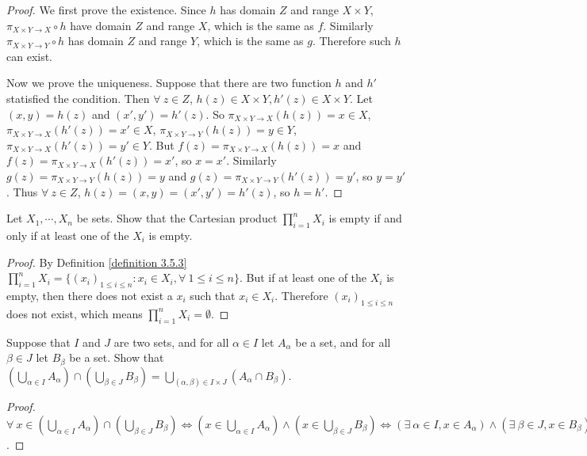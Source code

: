 \begin{proof}
We first prove the existence.
Since \(h\) has domain \(Z\) and range \(X \times Y\), \(\pi_{X \times Y \to X} \circ h\) have domain \(Z\) and range \(X\), which is the same as \(f\).
Similarly \(\pi_{X \times Y \to Y} \circ h\) has domain \(Z\) and range \(Y\), which is the same as \(g\).
Therefore such \(h\) can exist.

Now we prove the uniqueness.
Suppose that there are two function \(h\) and \(h'\) statisfied the condition.
Then \(\forall\ z \in Z\), \(h(z) \in X \times Y, h'(z) \in X \times Y\).
Let \((x, y) = h(z)\) and \((x', y') = h'(z)\).
So \(\pi_{X \times Y \to X}(h(z)) = x \in X\), \(\pi_{X \times Y \to X}(h'(z)) = x' \in X\), \(\pi_{X \times Y \to Y}(h(z)) = y \in Y\), \(\pi_{X \times Y \to X}(h'(z)) = y' \in Y\).
But \(f(z) = \pi_{X \times Y \to X}(h(z)) = x\) and \(f(z) = \pi_{X \times Y \to X}(h'(z)) = x'\), so \(x = x'\).
Similarly \(g(z) = \pi_{X \times Y \to Y}(h(z)) = y\) and \(g(z) = \pi_{X \times Y \to Y}(h'(z)) = y'\), so \(y = y'\).
Thus \(\forall\ z \in Z\), \(h(z) = (x, y) = (x', y') = h'(z)\), so \(h = h'\).
\end{proof}

\begin{exercise}\label{exercise 3.5.8}
Let \(X_1, \cdots, X_n\) be sets.
Show that the Cartesian product \(\prod_{i = 1}^n X_i\) is empty if and only if at least one of the \(X_i\) is empty.
\end{exercise}

\begin{proof}
By Definition \ref{definition 3.5.3} \(\prod_{i = 1}^n X_i = \{(x_i)_{1 \leq i \leq n} : x_i \in X_i, \forall\ 1 \leq i \leq n\}\).
But if at least one of the \(X_i\) is empty, then there does not exist a \(x_i\) such that \(x_i \in X_i\).
Therefore \((x_i)_{1 \leq i \leq n}\) does not exist, which means \(\prod_{i = 1}^n X_i = \emptyset\).
\end{proof}

\begin{exercise}\label{exercise 3.5.9}
Suppose that \(I\) and \(J\) are two sets, and for all \(\alpha \in I\) let \(A_{\alpha}\) be a set, and for all \(\beta \in J\) let \(B_{\beta}\) be a set.
Show that \((\bigcup_{\alpha \in I} A_{\alpha}) \cap (\bigcup_{\beta \in J} B_{\beta}) = \bigcup_{(\alpha, \beta) \in I \times J} (A_{\alpha} \cap B_{\beta})\).
\end{exercise}

\begin{proof}
\(\forall\ x \in (\bigcup_{\alpha \in I} A_{\alpha}) \cap (\bigcup_{\beta \in J} B_{\beta}) \iff (x \in \bigcup_{\alpha \in I} A_{\alpha}) \land (x \in \bigcup_{\beta \in J} B_{\beta}) \iff (\exists\ \alpha \in I, x \in A_{\alpha}) \land (\exists\ \beta \in J, x \in B_{\beta}) \iff \exists\ \alpha \in I \ \exists\ \beta \in J, x \in A_{\alpha} \cap B_{\beta} \iff \exists\ (\alpha, \beta) \in I \times J, x \in A_{\alpha} \cap B_{\beta} \iff x \in \bigcup_{(\alpha, \beta) \in I \times J} (A_{\alpha} \cap B_{\beta})\).
\end{proof}

